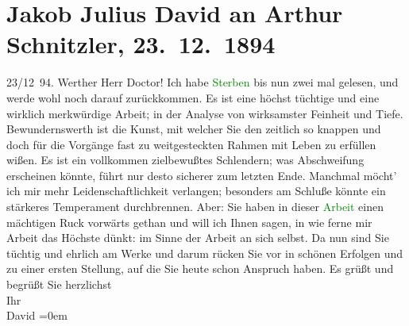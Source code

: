 

               \section[Jakob Julius David an Arthur Schnitzler, 23. 12. 1894]{ Jakob Julius David an Arthur Schnitzler, 23. 12. 1894}\nopagebreak{}\rehead{ }\normalsize\beginnumbering{} \toendnotes[C]{\smallbreak\pagebreak[2]} 
\toendnotes[C]{\smallbreak}\pstart
           \raggedleft{}{\pb}23/12 94.\pend
           \pstart\center{}Werther Herr Doctor!\pend\pstart
           Ich habe \textcolor{green}{Sterben}{}\ledrightnote{\textcolor{green}{Sterben. Novelle}} bis nun zwei mal gelesen, und
               werde wohl noch darauf zurückkommen. Es ist eine höchst tüchtige und eine wirklich
               merkwürdige Arbeit; in der Analyse von wirksamster Feinheit und Tiefe.
               Bewundernswerth ist die Kunst, mit welcher Sie den zeitlich so knappen und doch für
               die Vorgänge fast zu weitgesteckten Rahmen mit Leben zu erfüllen wißen. Es ist ein
               vollkommen zielbewußtes Schlendern; was Abschweifung erscheinen könnte, führt nur
               desto sicherer zum letzten Ende. Manchmal möcht’ ich mir mehr Leidenschaftlichkeit
               verlangen; besonders am Schluße könnte ein stärkeres Temperament durchbrennen. Aber:
               Sie haben in dieser \textcolor{green}{Arbeit}{} einen
               mächtigen Ruck vorwärts gethan und will ich Ihnen sagen, in wie ferne mir Arbeit das
               Höchste dünkt: im Sinne der Arbeit an sich selbst. Da nun sind Sie tüchtig und
               ehrlich am Werke und darum rücken Sie vor in schönen Erfolgen und zu einer ersten
               Stellung, auf die Sie heute schon Anspruch haben.\pend
           \pstart
           Es grüßt und begrüßt Sie herzlichst{\\[\baselineskip]}Ihr{\\[\baselineskip]}\spacefill\mbox{David}\pend
           \leftskip=0em{}\endnumbering{}  
      